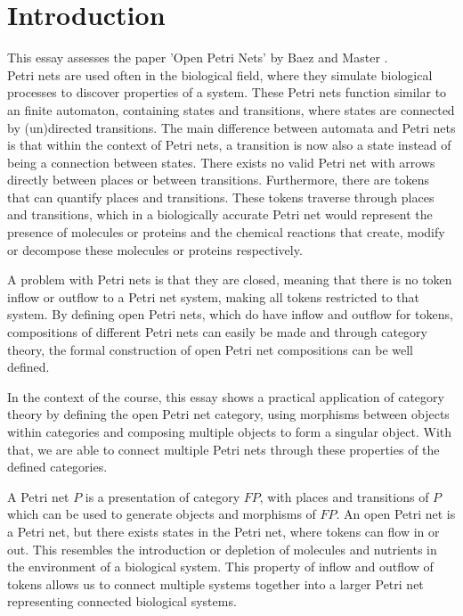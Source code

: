 \documentclass[utf8,british]{cms-essay}
\begin{document}
\maketitle{}

\section{Introduction}
\label{sec:introduction}

This essay assesses the paper 'Open Petri Nets' by Baez and Master \cite{baez2020open}.\\

Petri nets are used often in the biological field, where they simulate biological processes to discover properties of a system. These Petri nets function similar to an finite automaton, containing states and transitions, where states are connected by (un)directed transitions. The main difference between automata and Petri nets is that within the context of Petri nets, a transition is now also a state instead of being a connection between states. 
There exists no valid Petri net with arrows directly between places or between transitions. Furthermore, there are tokens that can quantify places and transitions. These tokens traverse through places and transitions, which in a biologically accurate Petri net would represent the presence of molecules or proteins and the chemical reactions that create, modify or decompose these molecules or proteins respectively.

A problem with Petri nets is that they are closed, meaning that there is no token inflow or outflow to a Petri net system, making all tokens restricted to that system. By defining open Petri nets, which do have inflow and outflow for tokens, compositions of different Petri nets can easily be made and through category theory, the formal construction of open Petri net compositions can be well defined.

In the context of the course, this essay shows a practical application of category theory by defining the open Petri net category, using morphisms between objects within categories and composing multiple objects to form a singular object. With that, we are able to connect multiple Petri nets through these properties of the defined categories.

A Petri net $P$ is a presentation of category $FP$, with places and transitions of $P$ which can be used to generate objects and morphisms of $FP$. An open Petri net is a Petri net, but there exists states in the Petri net, where tokens can flow in or out. This resembles the introduction or depletion of molecules and nutrients in the environment of a biological system. This property of inflow and outflow of tokens allows us to connect multiple systems together into a larger Petri net representing connected biological systems. 
\end{document}
